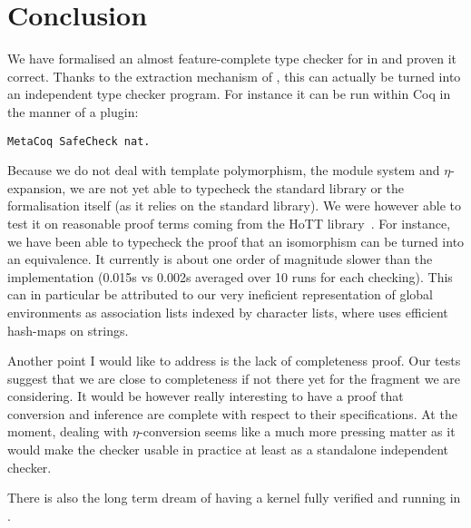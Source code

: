 \chapter{Conclusion}

We have formalised an almost feature-complete type checker for \Coq in \Coq
and proven it correct. Thanks to the extraction mechanism of \Coq, this can
actually be turned into an independent type checker program.
For instance it can be run within Coq in the manner of a plugin:
\begin{verbatim}
MetaCoq SafeCheck nat.
\end{verbatim}

Because we do not deal with template polymorphism, the module system and
\(\eta\)-expansion, we are not yet able to typecheck the standard library
or the formalisation itself (as it relies on the standard library).
We were however able to test it on reasonable proof terms coming from
the \acrshort{HoTT} library~.
%
For instance, we have been able to typecheck the proof that an isomorphism can
be turned into an equivalence.
It currently is about one order of magnitude slower than the \Coq
implementation (0.015s vs 0.002s averaged over 10 runs for each checking).
This can in particular be attributed to our very ineficient representation of
global environments as association lists indexed by character lists, where \Coq
uses efficient hash-maps on strings.

Another point I would like to address is the lack of completeness proof.
Our tests suggest that we are close to completeness if not there yet for the
fragment we are considering. It would be however really interesting to have a
proof that conversion and inference are complete with respect to their
specifications.
At the moment, dealing with \(\eta\)-conversion seems like a much more pressing
matter as it would make the checker usable in practice at least as a standalone
independent checker.

There is also the long term dream of having a \Coq kernel fully verified and
running in \Coq.